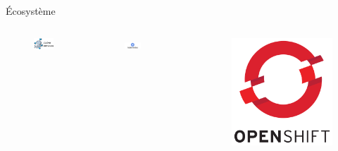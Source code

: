 \documentclass[11pt]{beamer}
\begin{document}
\begin{frame}{Écosystème}
\begin{columns}
	\begin{column}{0.33\textwidth}
		\begin{figure}
			\includegraphics[scale=0.20]{images/docker_compose.png}
		\end{figure}	
	\end{column}
	\begin{column}{0.33\textwidth}
		\begin{figure}
			\includegraphics[scale=0.25]{images/kubernetes.png}
		\end{figure}	
	\end{column}\
	\begin{column}{0.33\textwidth}
		\begin{figure}
			\includegraphics[scale=0.04]{images/openshift.png}

\end{figure}
\end{column}
\end{columns}
\end{frame}
\end{document}
